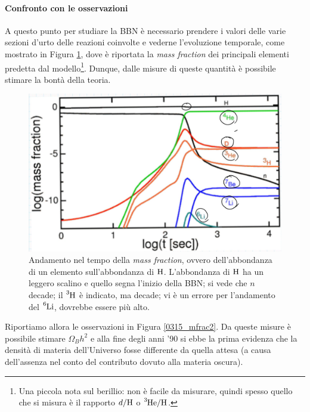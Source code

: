 \paragraph{Confronto con le osservazioni} A questo punto per studiare la BBN è necessario prendere i valori delle varie sezioni d'urto delle reazioni coinvolte e vederne l'evoluzione temporale, come mostrato in Figura \ref{0315_mfrac}, dove è riportata la \textit{mass fraction} dei principali elementi predetta dal modello\footnote{Una piccola nota sul berillio: non è facile da misurare, quindi spesso quello che si misura è il rapporto $d/\ce{H}$ o $\ce{^3He/H}$.}. Dunque, dalle misure di queste quantità è possibile stimare la bontà della teoria.

\begin{figure}[h]
    \centering
    \includegraphics[scale=0.2]{Immagini/0315_massfraction.png}
    \caption{Andamento nel tempo della \textit{mass fraction}, ovvero dell'abbondanza di un elemento sull'abbondanza di $\ce{H}$. L'abbondanza di $\ce{H}$ ha un leggero scalino e quello segna l'inizio della BBN; si vede che $n$ decade; il $\ce{^3H}$ è indicato, ma decade; vi è un errore per l'andamento del $\ce{^6Li}$, dovrebbe essere più alto.}
    \label{0315_mfrac}
\end{figure}

\noindent Riportiamo allora le osservazioni in Figura \ref{0315_mfrac2}. Da queste misure è possibile stimare $\Omega_B h^2$ e alla fine degli anni '90 si ebbe la prima evidenza che la densità di materia dell'Universo fosse differente da quella attesa (a causa dell'assenza nel conto del contributo dovuto alla materia oscura). 

